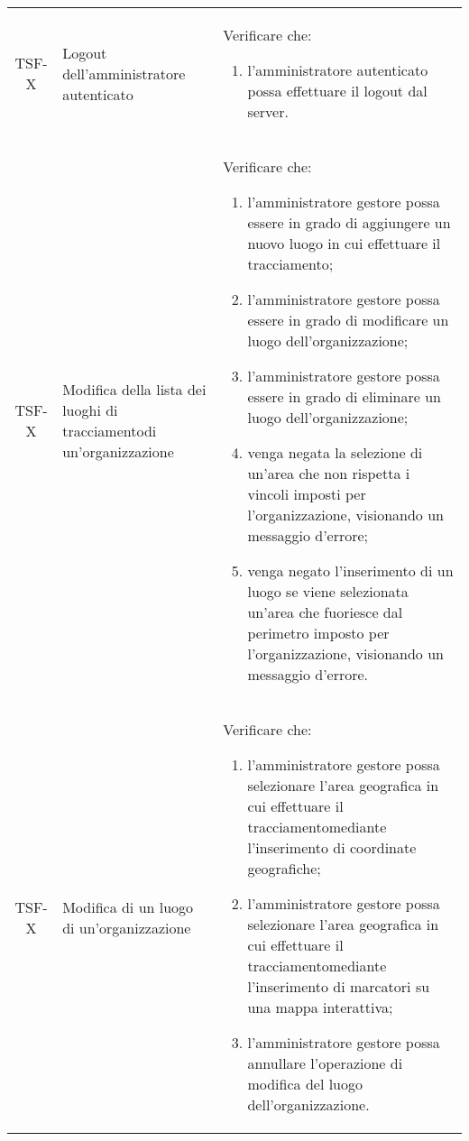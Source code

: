 {\begin{longtable}{ c | C{3cm} | C{11cm} }
TSF-X & Logout dell'amministratore autenticato & 
Verificare che:
\begin{enumerate}
    \item l'amministratore autenticato possa effettuare il logout dal server.
\end{enumerate} \\

TSF-X & Modifica della lista dei luoghi di tracciamentodi un'organizzazione & 
Verificare che:
\begin{enumerate}
    \item l'amministratore gestore possa essere in grado di aggiungere un nuovo luogo in cui effettuare il tracciamento;
    \item l'amministratore gestore possa essere in grado di modificare un luogo dell'organizzazione;
    \item l'amministratore gestore possa essere in grado di eliminare un luogo dell'organizzazione;
    \item venga negata la selezione di un'area che non rispetta i vincoli imposti per l'organizzazione, visionando un messaggio d'errore;
    \item venga negato l'inserimento di un luogo se viene selezionata un'area che fuoriesce dal perimetro imposto per l'organizzazione, visionando un messaggio d'errore.
\end{enumerate} \\

TSF-X & Modifica di un luogo di un'organizzazione & 
Verificare che:
\begin{enumerate}
    \item l'amministratore gestore possa selezionare l'area geografica in cui effettuare il tracciamentomediante l'inserimento di coordinate geografiche;
    \item l'amministratore gestore possa selezionare l'area geografica in cui effettuare il tracciamentomediante l'inserimento di marcatori su una mappa interattiva;
    \item l'amministratore gestore possa annullare l'operazione di modifica del luogo dell'organizzazione.
\end{enumerate} \\


\end{longtable}}
